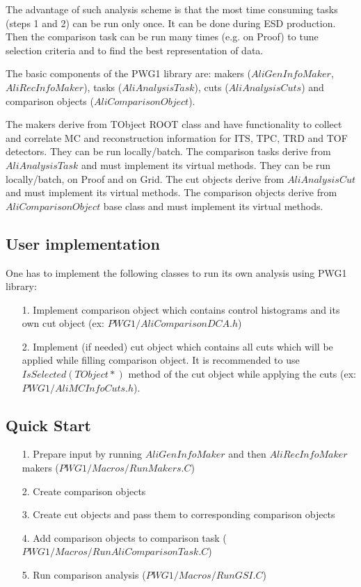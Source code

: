 \documentclass{elsart}
\begin{document}
The advantage of such analysis scheme is that the most time consuming
tasks (steps 1 and 2) can be run only once. It can be done during
ESD production. Then the comparison task can be run many times (e.g. on Proof) 
to tune selection criteria and to find the best representation of data. 

The basic components of the PWG1 library are: makers ($AliGenInfoMaker$, $AliRecInfoMaker$), 
tasks ($AliAnalysisTask$), cuts ($AliAnalysisCuts$) and comparison objects ($AliComparisonObject$). 

The makers derive from TObject ROOT class and have functionality to collect and correlate MC and reconstruction 
information for ITS, TPC, TRD and TOF detectors. They can be run locally/batch. The comparison tasks derive from $AliAnalysisTask$ and must implement its virtual methods. They can be run locally/batch, on Proof and on Grid. The cut objects derive from $AliAnalysisCut$ and must implement its virtual methods. The comparison objects derive from $AliComparisonObject$ base class and must implement its virtual methods.

\subsection{User implementation}

One has to implement the following classes to run its own analysis using PWG1 library:

\begin{itemize}
\item[1.] Implement comparison object which contains control histograms and its own cut object (ex: $PWG1/AliComparisonDCA.h$) 
\item[2.] Implement (if needed) cut object which contains all cuts which will be applied while filling comparison object. It is recommended to use $IsSelected(TObject*)$ method of the cut object while applying the cuts (ex: $PWG1/AliMCInfoCuts.h$).
\end{itemize}
 
\subsection{Quick Start}
 
\begin{itemize}
\item[1.] Prepare input by running $AliGenInfoMaker$ and then $AliRecInfoMaker$ makers ($PWG1/Macros/RunMakers.C$)
\item[2.] Create comparison objects 
\item[3.] Create cut objects and pass them to corresponding comparison objects
\item[4.] Add comparison objects to comparison task \newline ($PWG1/Macros/RunAliComparisonTask.C$)
\item[5.] Run comparison analysis ($PWG1/Macros/RunGSI.C$)

\end{itemize}
 
\end{document}
